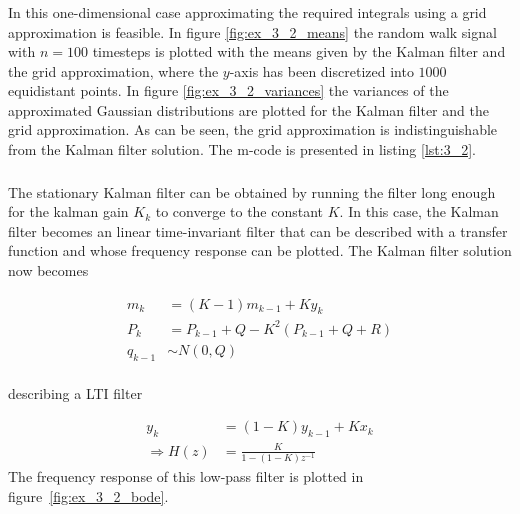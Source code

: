 \documentclass[a4paper,oneside,article]{memoir}
\begin{document}
\subsubsection{}
In this one-dimensional case approximating the required
integrals using a grid approximation is feasible. In figure \ref{fig:ex_3_2_means}
the random walk signal with $n=100$ timesteps is plotted with the means given
by the Kalman filter and the grid approximation, where the $y$-axis has been discretized
into $1000$ equidistant points. In figure \ref{fig:ex_3_2_variances}
the variances of the approximated Gaussian distributions are plotted for 
the Kalman filter and the grid approximation. As can be seen, the grid approximation
is indistinguishable from the Kalman filter solution. The m-code is presented in listing \ref{lst:3_2}. 
\subsubsection{}
The stationary Kalman filter can be obtained by running the filter long enough for
the kalman gain $K_k$ to converge to the constant $K$. In this case, the Kalman filter becomes an linear time-invariant
filter that can be described with a transfer function and whose frequency response can be plotted.
The Kalman filter solution now becomes

\begin{align}
	m_k&=(K-1)m_{k-1}+Ky_k\\
	P_k&=P_{k-1}+Q-K^2(P_{k-1}+Q+R)\\
	q_{k-1} &\sim N\left(0,Q\right)\\
\end{align}

describing a LTI filter

\begin{align}
	y_k&=(1-K)y_{k-1}+Kx_k\\
	\Rightarrow H(z)&=\frac{K}{1-(1-K)z^{-1}}
\end{align}
The frequency response of this low-pass filter is plotted in
figure~\ref{fig:ex_3_2_bode}.

\clearpage

\end{document}
